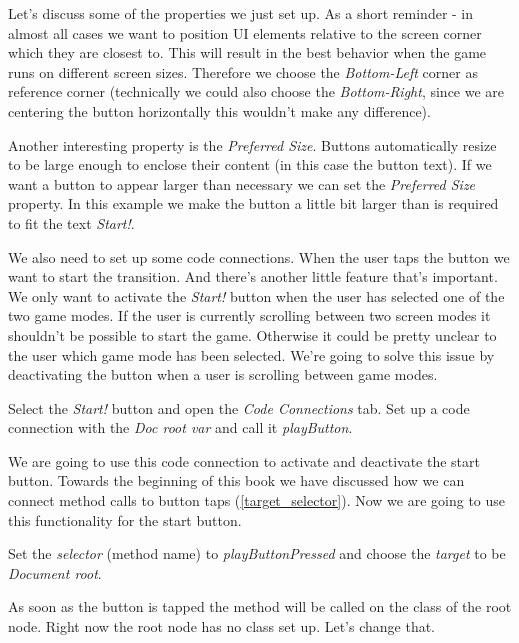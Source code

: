 Let's discuss some of the properties we just set up. As a short reminder - in
almost all cases we want to position UI elements relative to the screen corner
which they are closest to. This will result in the best behavior when the game
runs on different screen sizes. Therefore we choose the \textit{Bottom-Left}
corner as reference corner (technically we could also choose the
\textit{Bottom-Right}, since we are centering the button horizontally this
wouldn't make any difference).

Another interesting property is the \textit{Preferred Size}. Buttons
automatically resize to be large enough to enclose their content (in this case
the button text). If we want a button to appear larger than necessary we can set
the \textit{Preferred Size} property. In this example we make the button a
little bit larger than is required to fit the text \textit{Start!}.

We also need to set up some code connections. When the user taps the button we
want to start the transition. And there's another little feature that's
important. We only want to activate the \textit{Start!} button when the user has
selected one of the two game modes. If the user is currently scrolling between
two screen modes it shouldn't be possible to start the game. Otherwise it could
be pretty unclear to the user which game mode has been selected. We're going to
solve this issue by deactivating the button when a user is scrolling between
game modes.

\begin{leftbar}
Select the \textit{Start!} button and open the \textit{Code Connections}
tab. Set up a code connection with the \textit{Doc root var} and call it
\textit{playButton}. 
\end{leftbar}

We are going to use this code connection to activate and deactivate the start
button. Towards the beginning of this book we have discussed how we can connect
method calls to button taps (\ref{target_selector}). Now we are going to use
this functionality for the start button.

\begin{leftbar}
Set the \textit{selector} (method name) to \textit{playButtonPressed} and choose
the \textit{target} to be \textit{Document root}.
\end{leftbar}

As soon as the button is tapped the  method will
be called on the class of the root node. Right now the root node has no class set
up. Let's change that.

